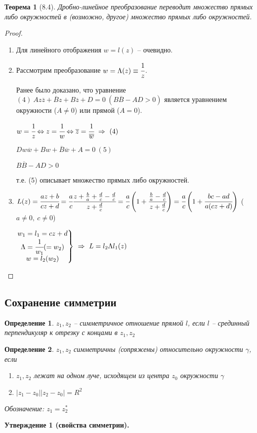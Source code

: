 \documentclass[draft]{article}
\newcommand{\forcenewline}{$\phantom{\mbox{newline}}$\newline}
\newcommand{\then}{\ \Rightarrow\ }
\newcommand{\LRA}{\Leftrightarrow}
\renewcommand{\bar}{\overline}
\newcommand{\g}{\gamma}
\renewcommand{\L}{\Lambda}
\newcommand{\z}{\bar{z}}
\newcommand{\bsys}[1]{\left.\begin{matrix}#1\end{matrix}\right\}}
\newcommand{\opr}[1]{\begin{opred}#1\end{opred}}
\newtheorem*{theor}{Теорема}
\newtheorem*{opred}{Определение}
\theoremstyle{remark}
\begin{document}
\begin{theor}[8.4]
Дробно-линейное преобразование переводит множество прямых либо окружностей в (возможно, другое) множество прямых либо окружностей.
\end{theor}
\begin{proof}
\begin{enumerate}
\item Для линейного отображения $w=l(z)$ -- очевидно.
\item Рассмотрим преобразование $w=\Lambda(z)\equiv \cfrac 1z$.

Ранее было доказано, что уравнение $(4)\ Az\z+\bar{B}z+B\z+D=0\ (B\bar{B}-AD>0)$ является уравнением окружности ($A\neq0$) или прямой ($A=0$).

$w=\cfrac 1z \LRA z=\cfrac 1w \LRA \bar{z}=\cfrac {1}{\bar{w}} \then (4)$

$Dw\bar{w}+Bw+\bar{B}\bar{w}+A=0\ (5)$

$B\bar{B}-AD>0$

т.е. (5) описывает множество прямых либо окружностей.
\item $L(z)=\cfrac{az+b}{cz+d}=\cfrac ac \cfrac {z+\frac ba+\frac dc-\frac dc}{z+\frac dc}=\cfrac ac\left(1+\cfrac{\frac ba-\frac dc}{z+\frac dc}\right)=\cfrac ac\left(1+\cfrac{bc-ad}{a(cz+d)}\right)$ ($a\neq 0,\ c\neq 0$)

$\bsys{w_1=l_1=cz+d \\ \L=\cfrac {1}{w_1}(=w_2) \\ w=l_2(w_2)}\then L=l_2\L l_1(z)$
\end{enumerate}
\end{proof}

\subsection{Сохранение симметрии}

\opr{$z_1, z_2$ -- симметричное отношение прямой $l$, если $l$ -- срединный перпендикуляр к отрезку с концами в $z_1, z_2$}
\opr{$z_1, z_2$ симметричны (сопряжены) относительно окружности $\g$, если
\begin{enumerate}
\item $z_1, z_2$ лежат на одном луче, исходящем из центра $z_0$ окружности $\g$
\item $|z_1-z_0||z_2-z_0|=R^2$
\end{enumerate}
Обозначение: $z_1=z_2^*$}

{\bfseries Утверждение 1 (свойства симметрии).}
\end{document}
